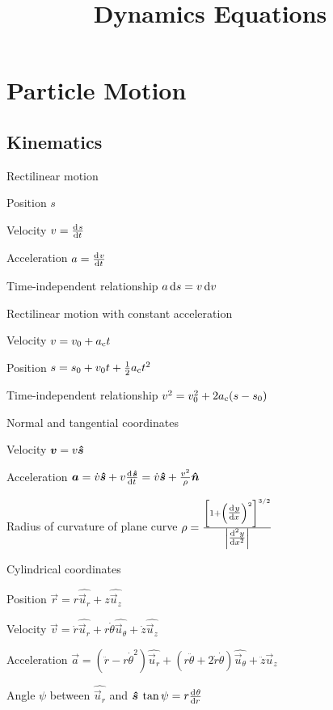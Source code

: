 \documentclass{article}
\title{Dynamics Equations}
\newcommand{\uuvec}[1]{\widehat{\vec{u}_{#1}}}
\begin{document}


\section{Particle Motion}
\label{sec:particle-motion}

\subsection{Kinematics}
\label{sec:particle-kinematics}

\begin{description*}
\item[Rectilinear motion]~
  \begin{description*}
    \item[Position] $s$
    \item[Velocity]
      \(v = \od{s}{t}\)
    \item[Acceleration]
      \(a = \od{v}{t}\)
    \item[Time-independent relationship]
      \(a\dif{s} = v\dif{v}\)
  \end{description*}
\item[Rectilinear motion with constant acceleration]~
  \begin{description*}
  \item[Velocity]
    \(v = v_0 + a_{\mathrm{c}}t\)
  \item[Position]
    \(s = s_0 + v_0t + \frac12a_{\mathrm{c}}t^2\)
  \item[Time-independent relationship]
    \(v^2 = v_0^2 + 2a_{\mathrm{c}}(s-s_0)\)
  \end{description*}
\item[Normal and tangential coordinates]~
  \begin{description*}
  \item[Velocity]
    \(\bm{v} = v\bm{\hat{s}}\)
  \item[Acceleration]
    \(\vec{a} = \dot{v}\uvec{s} + v\od{\uvec{s}}{t}
    = \dot{v}\uvec{s} + \frac{v^2}{\rho}\uvec{n}\)
  \item[Radius of curvature of plane curve]
    \(\rho = \frac{{\left[1+{\left(\od{y}{x}\right)}^2\right]}^{3/2}}{\left|\od[2]{y}{x}\right|}\)
  \end{description*}
\item[Cylindrical coordinates]~
  \begin{description*}
  \item[Position]
    \(\vec{r} = r\uuvec{r} + z\uuvec{z}\)
  \item[Velocity]
    \(\vec{v} = \dot{r}\uuvec{r} + r\dot{\theta}\uuvec{\theta} + \dot{z}\uuvec{z}\)
  \item[Acceleration]
    \(\vec{a}
    = (\ddot{r}-r\dot\theta^2)\uuvec{r}
    + (r\ddot\theta+2\dot{r}\dot\theta)\uuvec\theta
    + \ddot{z}\uuvec{z}\)
  \item[Angle $\psi$ between $\uuvec{r}$ and $\bm{\hat{s}}$]
    \(\tan\psi = r\od{\theta}{r}\)
  \end{description*}
\end{description*}
\end{document}
